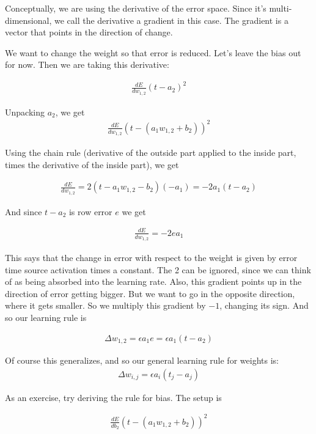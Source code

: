 Conceptually, we are using the derivative of the error space. Since it's multi-dimensional, we call the derivative a gradient in this case. The gradient is a vector that points in the direction of change. 

We want to change the weight so that error is reduced. Let's leave the bias out for now. Then we are taking this derivative:

\begin{eqnarray*}
\frac{dE}{dw_{1,2}} (t - a_2)^2
\end{eqnarray*}

Unpacking $a_2$, we get
\begin{eqnarray*}
\frac{dE}{dw_{1,2}} (t - ( a_1 w_{1,2} + b_2))^2 
\end{eqnarray*}

Using the chain rule (derivative of the outside part applied to the inside part, times the derivative of the inside part), we get

\begin{eqnarray*}
\frac{dE}{dw_{1,2}} = 2 (t - a_1 w_{1,2} - b_2) (-a_1) = -2 a_1 (t - a_2)
\end{eqnarray*}

And since $t - a_2$ is row error $e$ we get

\begin{eqnarray*}
\frac{dE}{dw_{1,2}} = -2 e a_1
\end{eqnarray*}

This says that the change in error with respect to the weight is given by error time source activation times a constant. The 2 can be ignored, since we can think of as being absorbed into the learning rate. Also, this gradient points up in the direction of error getting bigger. But we want to go in the opposite direction, where it gets smaller. So we multiply this gradient by $-1$, changing its sign. And so our learning rule is 

\begin{eqnarray*}
\Delta w_{1,2}  =  \epsilon a_1 e  = \epsilon a_1 (t - a_2)
\end{eqnarray*} 

Of course this generalizes, and so our general learning rule for weights is:
\begin{eqnarray*}
\Delta w_{i,j}  =  \epsilon a_i (t_j - a_j)
\end{eqnarray*} 

As an exercise, try deriving the rule for bias. The setup is

\begin{eqnarray*}
\frac{dE}{db_{2}} (t - ( a_1 w_{1,2} + b_2))^2 
\end{eqnarray*}


